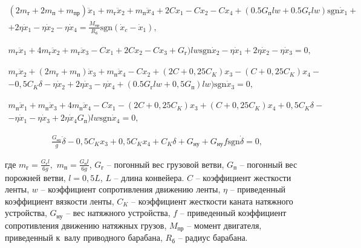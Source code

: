 \begin{eqnarray}
	( 2m_{\text{г}} + 2m_{\text{п}} + m_{\text{пр}} ) \ddot x_1 +  m_{\text{г}} \ddot x_2 +  m_{\text{п}} \ddot x_4  + 2Cx_1 - Cx_2 - Cx_4 + (0.5 G_{\text{п}} l w + 0.5 G_{\text{г}} l w ) \text{sgn} \dot x_1 +
\nonumber \\
	+ 2 \eta \dot x_1 - \eta \dot x_2 - \eta \dot x_4 = \frac{M_{\text{пр}}}{R_{\text{б}}} \text{sgn} (\dot x_c - \dot x_1),
\nonumber
\end{eqnarray}

\begin{eqnarray}
	m_{\text{г}} \ddot x_1 + 4 m_{\text{г}} \ddot x_2 + m_{\text{г}} \ddot x_3 - Cx_1 + 2Cx_2 - Cx_3 + G_{\text{г}}) l w \text{sgn} \dot x_2  - \eta \dot x_1 + 2 \eta \dot x_2 - \eta \dot x_3 = 0,
\nonumber
\end{eqnarray}

\begin{eqnarray}
	m_{\text{г}} \ddot x_2 + ( 2 m_{\text{г}} + m_{\text{п}} ) \ddot x_3 + m_{\text{п}} \ddot x_4  - Cx_2  + (2C + 0,25C_K) x_3 - (C + 0,25 C_K) x_4 - 
\nonumber \\
	- 0,5C_K \delta - \eta \dot x_2 + 2 \eta \dot x_3 - \eta \dot x_4 + (0.5 G_{\text{г}} l w + 0,5 G_{\text{п}} ) l w) \text{sgn} \dot x_3 = 0,
\nonumber
\end{eqnarray}

\begin{eqnarray}
	m_{\text{п}} \ddot x_1 + m_{\text{п}} \ddot x_3 + 4 m_{\text{п}} \ddot x_4 - Cx_1 - (2C + 0,25 C_K) x_3 + (C + 0,25 C_K) x_4  + 0,5 C_K \delta -
\nonumber \\
	- \eta \dot x_1 - \eta \dot x_3 + 2 \eta \dot x_4 G_{\text{п}}) l w \text{sgn} \dot x_4 = 0,
\nonumber
\end{eqnarray}

\begin{eqnarray}
	\frac{G_{\text{ну}}}{g} \ddot \delta - 0,5 C_K x_3 + 0,5 C_K x_4 + C_K \delta + G_{\text{ну}} + G_{\text{ну}} f \text{sgn} \dot \delta = 0,
\nonumber
\end{eqnarray}

где $ m_{\text{г}} = \frac{G_{\text{г}} l }{6g}, $ $ m_{\text{п}} = \frac{G_{\text{п}} l}{6g} $, $ G_{\text{г}} $ -- погонный вес грузовой ветви, $ G_{\text{п}} $ -- погонный вес порожней ветви, $ l = 0,5L $, $ L $ -- длина конвейера. $ C $ -- коэффициент жесткости ленты, $ w $ -- коэффициент сопротивления движению ленты, $ \eta $ -- приведенный коэффициент вязкости ленты, $ C_K $ -- коэффициент жесткости каната натяжного устройства, $ G_{\text{ну}} $ -- вес натяжного устройства, $ f $ -- приведенный коэффициент сопротивления движению натяжных грузов, $ M_{\text{пр}} $ -- момент двигателя, приведенный к~валу приводного барабана, $ R_{\text{б}} $ -- радиус барабана.

